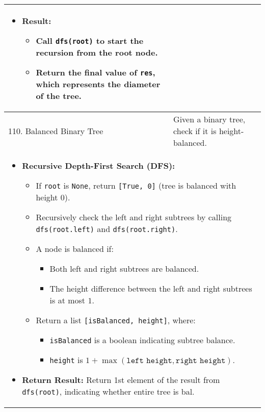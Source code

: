 \begin{summary}
\begin{center}
\begin{tabular}{ll}
{\begin{itemize}
                    \item \textbf{Result:}
                    \begin{itemize}
                        \item Call \texttt{dfs(root)} to start the recursion from the root node.
                        \item Return the final value of \texttt{res}, which represents the diameter of the tree.
                    \end{itemize}
                \end{itemize}                
            } \\
            \midrule
            110. Balanced Binary Tree & Given a binary tree, check if it is height-balanced. \\
            \multicolumn{2}{p{\linewidth}}{
                \begin{itemize}
                    \item \textbf{Recursive Depth-First Search (DFS):}
                    \begin{itemize}
                        \item If \texttt{root} is \texttt{None}, return \texttt{[True, 0]} (tree is balanced with height $0$).
                        \item Recursively check the left and right subtrees by calling \texttt{dfs(root.left)} and \texttt{dfs(root.right)}.
                        \item A node is balanced if:
                        \begin{itemize}
                            \item Both left and right subtrees are balanced.
                            \item The height difference between the left and right subtrees is at most $1$.
                        \end{itemize}
                        \item Return a list \texttt{[isBalanced, height]}, where:
                        \begin{itemize}
                            \item \texttt{isBalanced} is a boolean indicating subtree balance.
                            \item \texttt{height} is $1 + \max(\texttt{left height}, \texttt{right height})$.
                        \end{itemize}
                    \end{itemize}
                
                    \item \textbf{Return Result:} Return 1st element of the result from \texttt{dfs(root)}, indicating whether entire tree is bal.
                \end{itemize}
            } \\
            \bottomrule
        \end{tabular}
    \end{center}
\end{summary}
\newpage

